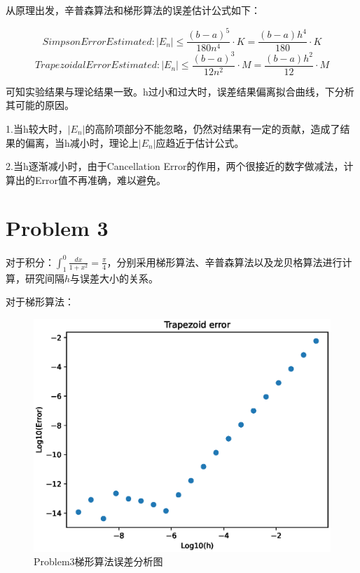 \documentclass[12pt,a4paper]{article}%
\begin{document}
    从原理出发，辛普森算法和梯形算法的误差估计公式如下：

    \[Simpson Error Estimated:| E_n | \leq \frac{(b-a)^5}{180n^4}\cdot K =\frac{(b-a)h^4}{180}\cdot K  \]
    \[Trapezoidal Error Estimated:| E_n | \leq \frac{(b-a)^3}{12n^2}\cdot M =\frac{(b-a)h^2}{12}\cdot M  \]

    可知实验结果与理论结果一致。h过小和过大时，误差结果偏离拟合曲线，下分析其可能的原因。
    
    1.当h较大时，$|E_n|$的高阶项部分不能忽略，仍然对结果有一定的贡献，造成了结果的偏离，当h减小时，理论上$|E_n|$应趋近于估计公式。

    2.当h逐渐减小时，由于Cancellation Error的作用，两个很接近的数字做减法，计算出的Error值不再准确，难以避免。

    \section{Problem 3}
    对于积分：$\int_{1}^{0} \frac{dx}{1+x^2} =\frac{\pi}{4} $，分别采用梯形算法、辛普森算法以及龙贝格算法进行计算，研究间隔$h$与误差大小的关系。

    对于梯形算法：

    \begin{figure}[H]%
        \centering
        \begin{minipage}{0.83\textwidth}%
            \centering
            \includegraphics[width=1.0%
            \textwidth]{Problem3.1.eps}%
            \caption{\fontsize{10pt}{15pt}\selectfont Problem3梯形算法误差分析图}%
        \end{minipage}\label{fig:figure4}
    \end{figure}
\end{document}
